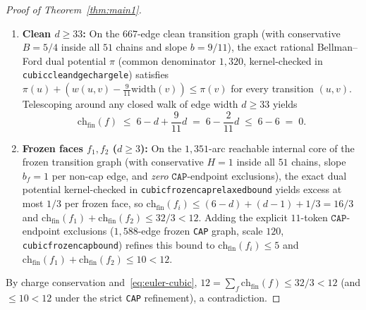 \documentclass[11pt,reqno]{amsart}
\theoremstyle{plain}
\theoremstyle{definition}
\theoremstyle{remark}
\newcommand{\chf}{\mathrm{ch}_{\mathrm{fin}}}
\DeclareRobustCommand{\_}{\ifmmode\text{\textunderscore}\else\textunderscore\allowbreak\fi}
\begin{document}
\begin{proof}[Proof of Theorem~\ref{thm:main1}]
\begin{enumerate}[label=(\arabic*),leftmargin=2.2em]
\begin{itemize}[leftmargin=1.5em]
    (each cyclic orbit appears $4$ times according to which of its $4$ $N$-tokens starts the \texttt{starts\_N} rotation: $12 \times 4 = 48$). Here \texttt{X} maps $(T_{1R}, T_{1L}, N)$ to the $5$-vertex ($4$-edge) contact arc $(0, 1, 2, 3, 4)$ of \texttt{tri\_hex\_pair} plus its trailing $N$-edge $(4, 5)$; \texttt{L} maps $(C_{T_{1R}, TP_{sL}}, N)$ to the $4$-edge arc $(10, 6, 2, 1, 5)$ of $(T_1, H_6, P, T_2)$ plus its trailing $N$-edge; \texttt{R} maps $(C_{TP_{sR}, T_{1L}}, N)$ to the exact mirror of \texttt{L}; and \texttt{T} maps $(T, N)$ to the $1$-edge triangle contact $(0, 1)$ plus its trailing $N$-edge ($5 + 5 + 5 + 2 = 17$ edges in \texttt{degree17\_patch}, \texttt{verify\_planar\_eg.py:789--813}). Full boundary-weld enumeration across all $12$ seeds produces $114$ total quotients; all $114$ carry kernel-certified strict-schema simple cycles in $\{C_8, C_{16}, C_{32}\}$ (Lemma~\ref{lem:weld-sound}).
  \end{itemize}
  \item \textbf{Clean $d \ge 33$:} On the $667$-edge clean transition graph (with conservative $B = 5/4$ inside all $51$ chains and slope $b = 9/11$), the exact rational Bellman--Ford dual potential $\pi$ (common denominator $1{,}320$, kernel-checked in \texttt{cubic\_clean\_d\_ge\_33\_charge\_le}) satisfies $\pi(u) + (w(u,v) - \frac{9}{11}\mathrm{width}(v)) \le \pi(v)$ for every transition $(u,v)$. Telescoping around any closed walk of edge width $d \ge 33$ yields
  \[
    \chf(f) \;\le\; 6 - d + \frac{9}{11} d \;=\; 6 - \frac{2}{11} d \;\le\; 6 - 6 \;=\; 0.
  \]
  \item \textbf{Frozen faces $f_1, f_2$ ($d \ge 3$):} On the $1{,}351$-arc reachable internal core of the frozen transition graph (with conservative $H = 1$ inside all $51$ chains, slope $b_f = 1$ per non-cap edge, and \emph{zero} $\texttt{CAP}$-endpoint exclusions), the exact dual potential kernel-checked in \texttt{cubic\_frozen\_cap\_relaxed\_bound} yields excess at most $1/3$ per frozen face, so $\chf(f_i) \le (6 - d) + (d - 1) + 1/3 = 16/3$ and $\chf(f_1) + \chf(f_2) \le 32/3 < 12$. Adding the explicit $11$-token $\texttt{CAP}$-endpoint exclusions ($1{,}588$-edge frozen \texttt{CAP} graph, scale $120$, \texttt{cubic\_frozen\_cap\_bound}) refines this bound to $\chf(f_i) \le 5$ and $\chf(f_1) + \chf(f_2) \le 10 < 12$.
\end{enumerate}
By charge conservation and~\eqref{eq:euler-cubic}, $12 = \sum_f \chf(f) \le 32/3 < 12$ (and $\le 10 < 12$ under the strict \texttt{CAP} refinement), a contradiction.


\end{proof}
\end{document}
